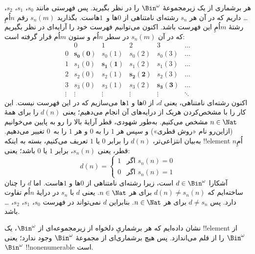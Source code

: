 {
  هر برشماری از یک زیرمجموعهٔ $\Bin^\omega$ را در نظر بگیرید. پس فهرستی
  مانند $s_{0}$، $s_{1}$، $s_{2}$، \dots{} داریم که در آن هر $s_n$ رشته‌ای
  نامتناهی از $0$ها و~$1$هاست. بگذارید $s_n(m)$ رقم $n$اُمِ رشتهٔ $m$اُمِ
  این فهرست باشد. اکنون می‌توانیم فهرست خود را آرایه‌ای در نظر بگیریم که
  در آن $s_n(m)$ در سطر $n$اُم و ستون $m$اُم قرار گرفته است:
  \[
  \begin{array}{c|c|c|c|c|c}
  & 0 & 1 & 2 & 3 & \dots \\\hline
  0 & \mathbf{s_{0}(0)} & s_{0}(1) & s_{0}(2) & s_0(3) & \dots \\\hline
  1 & s_{1}(0)& \mathbf{s_{1}(1)} & s_1(2) & s_1(3) & \dots \\\hline
  2 & s_{2}(0)& s_{2}(1) & \mathbf{s_2(2)} & s_2(3) & \dots \\\hline
  3 & s_{3}(0)& s_{3}(1) & s_3(2) & \mathbf{s_3(3)} & \dots \\\hline
  \vdots & \vdots & \vdots & \vdots & \vdots & \mathbf{\ddots}
  \end{array}
  \]
  اکنون رشته‌ای نامتناهی، یعنی $d$، از $0$ها و $1$ها می‌سازیم که در این
  فهرست نیست. این کار را با مشخص‌کردن هریک از درایه‌های آن انجام می‌دهیم؛
  یعنی $d(n)$ را برای همهٔ $n \in \Nat$ مشخص می‌کنیم. به‌طور شهودی، قطر
  آرایهٔ بالا را رو به پایین می‌خوانیم (ازاین‌رو نام «روش قطری») و سپس هر
  $1$ را به $0$ و هر $1$ را به~$0$ تغییر می‌دهیم. به‌بیان انتزاعی‌تر،
  $d(n)$ را برابر $0$ یا $1$ تعریف می‌کنیم، بسته به اینکه !!{element}
  $n$اُمِ قطر، یعنی $s_n(n)$، برابر $1$ یا $0$ باشد؛ یعنی:
  \[
  d(n) =
  \begin{cases}
  1 & \text{اگر $s_{n}(n) = 0$}\\
  0 & \text{اگر $s_{n}(n) = 1$}
  \end{cases}
  \]
  آشکارا $d \in \Bin^\omega$ است، زیرا رشته‌ای نامتناهی از $0$ها و $1$هاست.
  اما $d$ را چنان ساخته‌ایم که $d(n) \neq s_n(n)$ برای هر $n \in \Nat$.
  یعنی $d$ با $s_n$ در درایهٔ $n$اُم تفاوت دارد. پس $d \neq s_n$
  برای هر $n\in \Nat$. بنابراین $d$ نمی‌تواند در فهرست
  $s_0$، $s_1$، $s_2$،
  \dots باشد.

  نشان داده‌ایم که هر برشماریِ دلخواه از زیرمجموعه‌ای از $\Bin^\omega$،
  یک !!{element} از $\Bin^\omega$ را از قلم می‌اندازد. پس هیچ برشماری‌ای
  از مجموعهٔ $\Bin^\omega$ وجود ندارد؛ یعنی $\Bin^\omega$
  !!{nonenumerable} است.
 }
